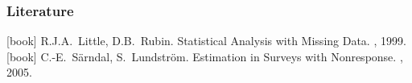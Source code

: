 \documentclass[10pt]{beamer}\usepackage[]{graphicx}\usepackage[]{color}
\begin{document}
\begin{frame}[allowframebreaks]\frametitle{Literature}
  \begin{thebibliography}{10}
   [book]
  R.J.A.~Little, D.B.~Rubin.
    \newblock Statistical Analysis with Missing Data.
    , 1999.
   [book]
  C.-E.~S\"{a}rndal, S.~Lundstr\"{o}m.
    \newblock Estimation in Surveys with Nonresponse.
    , 2005.
  \end{thebibliography}
  
\end{frame} 


%  
%  
 
 
 
 

\end{document}
